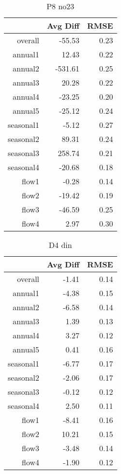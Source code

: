 \begin{table}[H]
\centering
\begin{tabular}{rrr}
  \hline
 & Avg Diff & RMSE \\ 
  \hline
overall & -55.53 & 0.23 \\ 
  annual1 & 12.43 & 0.22 \\ 
  annual2 & -531.61 & 0.25 \\ 
  annual3 & 20.28 & 0.22 \\ 
  annual4 & -23.25 & 0.20 \\ 
  annual5 & -25.12 & 0.24 \\ 
  seasonal1 & -5.12 & 0.27 \\ 
  seasonal2 & 89.31 & 0.24 \\ 
  seasonal3 & 258.74 & 0.21 \\ 
  seasonal4 & -20.68 & 0.18 \\ 
  flow1 & -0.28 & 0.14 \\ 
  flow2 & -19.42 & 0.19 \\ 
  flow3 & -46.59 & 0.25 \\ 
  flow4 & 2.97 & 0.30 \\ 
   \hline
\end{tabular}
\caption{P8 no23} 
\end{table}
\begin{table}[H]
\centering
\begin{tabular}{rrr}
  \hline
 & Avg Diff & RMSE \\ 
  \hline
overall & -1.41 & 0.14 \\ 
  annual1 & -4.38 & 0.15 \\ 
  annual2 & -6.58 & 0.14 \\ 
  annual3 & 1.39 & 0.13 \\ 
  annual4 & 3.27 & 0.12 \\ 
  annual5 & 0.41 & 0.16 \\ 
  seasonal1 & -6.77 & 0.17 \\ 
  seasonal2 & -2.06 & 0.17 \\ 
  seasonal3 & -0.12 & 0.12 \\ 
  seasonal4 & 2.50 & 0.11 \\ 
  flow1 & -8.41 & 0.16 \\ 
  flow2 & 10.21 & 0.15 \\ 
  flow3 & -3.48 & 0.14 \\ 
  flow4 & -1.90 & 0.12 \\ 
   \hline
\end{tabular}
\caption{D4 din} 
\end{table}
